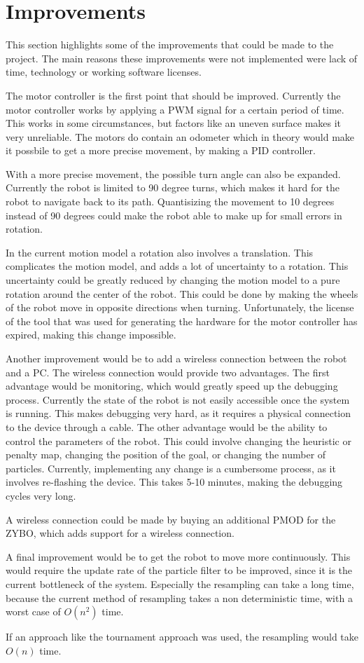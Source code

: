 \documentclass[Main]{subfiles}
\begin{document}
\section{Improvements} %
	\label{sec:improvements}

	This section highlights some of the improvements that could be made to the project.
	The main reasons these improvements were not implemented were lack of time, technology or working software licenses.
	
	The motor controller is the first point that should be improved.
	Currently the motor controller works by applying a PWM signal for a certain period of time.
	This works in some circumstances, but factors like an uneven surface makes it very unreliable.
	The motors do contain an odometer which in theory would make it possbile to get a more precise movement, by making a PID controller.
	
	With a more precise movement, the possible turn angle can also be expanded.
	Currently the robot is limited to 90 degree turns, which makes it hard for the robot to navigate back to its path.
	Quantisizing the movement to 10 degrees instead of 90 degrees could make the robot able to make up for small errors in rotation.
	
	In the current motion model a rotation also involves a translation.
	This complicates the motion model, and adds a lot of uncertainty to a rotation.
	This uncertainty could be greatly reduced by changing the motion model to  a pure rotation around the center of the robot.
	This could be done by making the wheels of the robot move in opposite directions when turning.
	Unfortunately, the license of the tool that was used for generating the hardware for the motor controller has expired, making this change impossible.
	
	Another improvement would be to add a wireless connection between the robot and a PC.
	The wireless connection would provide two advantages.
	The first advantage would be monitoring, which would greatly speed up the debugging process.
	Currently the state of the robot is not easily accessible once the system is running.
	This makes debugging very hard, as it requires a physical connection to the device through a cable.
	The other advantage would be the ability to control the parameters of the robot. 
	This could involve changing the heuristic or penalty map, changing the position of the goal, or changing the number of particles.
	Currently, implementing any change is a cumbersome process, as it involves re-flashing the device. 
	This takes 5-10 minutes, making the debugging cycles very long.
	
	A wireless connection could be made by buying an additional PMOD for the ZYBO, which adds support for a wireless connection.
	
	A final improvement would be to get the robot to move more continuously. 
	This would require the update rate of the particle filter to be improved, since it is the current bottleneck of the system.
	Especially the resampling can take a long time, because the current method of resampling takes a non deterministic time, with a worst case of $O(n^2)$ time.
	
	If an approach like the tournament approach was used, the resampling would take $O(n)$ time.
\end{document}
